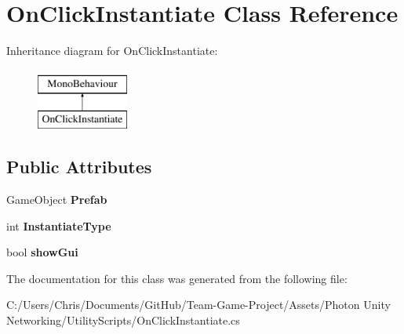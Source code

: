 \hypertarget{class_on_click_instantiate}{}\section{On\+Click\+Instantiate Class Reference}
\label{class_on_click_instantiate}
Inheritance diagram for On\+Click\+Instantiate\+:\begin{figure}[H]
\begin{center}
\leavevmode
\includegraphics[height=2.000000cm]{class_on_click_instantiate}
\end{center}
\end{figure}
\subsection*{Public Attributes}
\begin{DoxyCompactItemize}
\item 
Game\+Object {\bfseries Prefab}\hypertarget{class_on_click_instantiate_a4aefd39959a96154a9f5a9249d38be90}{}\label{class_on_click_instantiate_a4aefd39959a96154a9f5a9249d38be90}

\item 
int {\bfseries Instantiate\+Type}\hypertarget{class_on_click_instantiate_a1e3b8dfd6e6222b1f1e5a951d38cc1b5}{}\label{class_on_click_instantiate_a1e3b8dfd6e6222b1f1e5a951d38cc1b5}

\item 
bool {\bfseries show\+Gui}\hypertarget{class_on_click_instantiate_ae42e02f90b1f85076f4c085521951fdf}{}\label{class_on_click_instantiate_ae42e02f90b1f85076f4c085521951fdf}

\end{DoxyCompactItemize}


The documentation for this class was generated from the following file\+:\begin{DoxyCompactItemize}
\item 
C\+:/\+Users/\+Chris/\+Documents/\+Git\+Hub/\+Team-\/\+Game-\/\+Project/\+Assets/\+Photon Unity Networking/\+Utility\+Scripts/On\+Click\+Instantiate.\+cs\end{DoxyCompactItemize}
